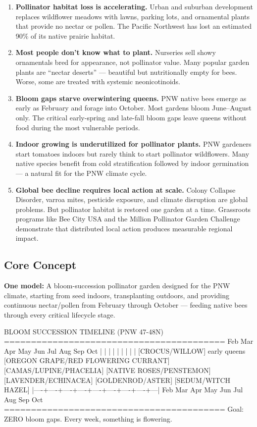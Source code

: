 \documentclass[11pt,letterpaper]{article}
\begin{document}
\begin{enumerate}
  \item \textbf{Pollinator habitat loss is accelerating.} Urban and suburban development replaces wildflower meadows with lawns, parking lots, and ornamental plants that provide no nectar or pollen. The Pacific Northwest has lost an estimated 90\% of its native prairie habitat.
  \item \textbf{Most people don't know what to plant.} Nurseries sell showy ornamentals bred for appearance, not pollinator value. Many popular garden plants are ``nectar deserts'' --- beautiful but nutritionally empty for bees. Worse, some are treated with systemic neonicotinoids.
  \item \textbf{Bloom gaps starve overwintering queens.} PNW native bees emerge as early as February and forage into October. Most gardens bloom June--August only. The critical early-spring and late-fall bloom gaps leave queens without food during the most vulnerable periods.
  \item \textbf{Indoor growing is underutilized for pollinator plants.} PNW gardeners start tomatoes indoors but rarely think to start pollinator wildflowers. Many native species benefit from cold stratification followed by indoor germination --- a natural fit for the PNW climate cycle.
  \item \textbf{Global bee decline requires local action at scale.} Colony Collapse Disorder, varroa mites, pesticide exposure, and climate disruption are global problems. But pollinator habitat is restored one garden at a time. Grassroots programs like Bee City USA and the Million Pollinator Garden Challenge demonstrate that distributed local action produces measurable regional impact.
\end{enumerate}

\subsection{Core Concept}

\textbf{One model:} A bloom-succession pollinator garden designed for the PNW climate, starting from seed indoors, transplanting outdoors, and providing continuous nectar/pollen from February through October --- feeding native bees through every critical lifecycle stage.

\begin{asciibox}
BLOOM SUCCESSION TIMELINE (PNW 47-48N)
=========================================
Feb  Mar  Apr  May  Jun  Jul  Aug  Sep  Oct
|    |    |    |    |    |    |    |    |
[CROCUS/WILLOW]          early queens
     [OREGON GRAPE/RED FLOWERING CURRANT]
          [CAMAS/LUPINE/PHACELIA]
               [NATIVE ROSES/PENSTEMON]
                    [LAVENDER/ECHINACEA]
                         [GOLDENROD/ASTER]
                              [SEDUM/WITCH HAZEL]
|----+----+----+----+----+----+----+----+---|
 Feb  Mar  Apr  May  Jun  Jul  Aug  Sep  Oct
=========================================
Goal: ZERO bloom gaps. Every week, something is flowering.
\end{asciibox}
\end{document}

